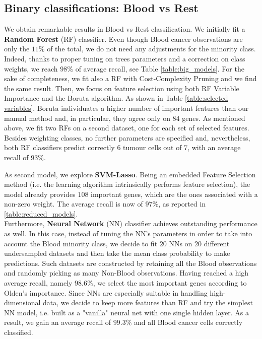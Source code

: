 \documentclass[a4paper,11pt, oneside]{article}  %
\begin{document}
\subsection{Binary classifications: Blood vs Rest}
We obtain remarkable results in Blood vs Rest classification.  We initially fit a \textbf{Random Forest} (RF) classifier.  Even though Blood cancer observations are only the $11\%$ of the total,  we do not need any adjustments for the minority class.  Indeed,  thanks to proper tuning on trees parameters and a correction on class weights, we reach $98\%$ of average recall, see Table \ref{table:big_models}. For the sake of completeness,  we fit also a RF with Cost-Complexity Pruning and we find the same result. Then, we focus on feature selection using both RF Variable Importance and the Boruta algorithm.  As shown in Table \ref{table:selected variables},  Boruta individuates a higher number of important features than our manual method and,  in particular,  they agree only on $84$ genes.  As mentioned above,  we fit two RFs on a second dataset, one for each set of selected features.  Besides weighting classes, no further parameters are specified and,  nevertheless,  both RF classifiers predict correctly $6$ tumour cells out of $7$,  with an average recall of $93\%$.

As second model,  we explore \textbf{SVM-Lasso}.  Being an 
embedded Feature Selection method (i.e.  the learning algorithm intrinsically performs feature selection),  the model already provides $108$ important genes,  which are the ones associated with a non-zero weight.  The average recall is now of $97\%$, as reported in \ref{table:reduced_models}. \\ %

Furthermore,  \textbf{Neural Network} (NN) classifier achieves outstanding performance as well.  In this case,  instead of tuning the NN's parameters in order to take into account the Blood minority class,  we decide to fit $20$ NNs on $20$ different undersampled datasets and then take the mean class probability to make predictions.  Such datasets are constructed by retaining all the Blood observations and randomly picking as many Non-Blood observations. Having reached a high average recall, namely $98.6\%$, we select the most important genes according to Olden's importance. Since NNs are especially suitable in handling high-dimensional data, we decide to keep more features than RF and try the simplest NN model, i.e.  built as a "vanilla" neural net with one single hidden layer.  As a result, we gain an average recall of $99.3\%$ and all Blood cancer cells correctly classified. 
\end{document}
